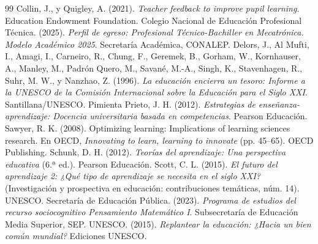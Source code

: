 \documentclass[spanish,letterpaper,oneside]{article}
\begin{document}
\clearpage
\begin{thebibliography}{99}
 Collin, J., y Quigley, A. (2021). \textit{Teacher feedback to improve pupil learning}. Education Endowment Foundation.
 Colegio Nacional de Educación Profesional Técnica. (2025). \textit{Perfil de egreso: Profesional Técnico-Bachiller en Mecatrónica. Modelo Académico 2025}. Secretaría Académica, CONALEP.
 Delors, J., Al Mufti, I., Amagi, I., Carneiro, R., Chung, F., Geremek, B., Gorham, W., Kornhauser, A., Manley, M., Padrón Quero, M., Savané, M.-A., Singh, K., Stavenhagen, R., Suhr, M. W., y Nanzhao, Z. (1996). \textit{La educación encierra un tesoro: Informe a la UNESCO de la Comisión Internacional sobre la Educación para el Siglo XXI}. Santillana/UNESCO.
 Pimienta Prieto, J. H. (2012). \textit{Estrategias de enseñanza-aprendizaje: Docencia universitaria basada en competencias}. Pearson Educación.
 Sawyer, R. K. (2008). Optimizing learning: Implications of learning sciences research. En OECD, \textit{Innovating to learn, learning to innovate} (pp. 45--65). OECD Publishing.
 Schunk, D. H. (2012). \textit{Teorías del aprendizaje: Una perspectiva educativa} (6.ª ed.). Pearson Educación.
 Scott, C. L. (2015). \textit{El futuro del aprendizaje 2: ¿Qué tipo de aprendizaje se necesita en el siglo XXI?} (Investigación y prospectiva en educación: contribuciones temáticas, núm. 14). UNESCO.
 Secretaría de Educación Pública. (2023). \textit{Programa de estudios del recurso sociocognitivo Pensamiento Matemático I}. Subsecretaría de Educación Media Superior, SEP.
 UNESCO. (2015). \textit{Replantear la educación: ¿Hacia un bien común mundial?} Ediciones UNESCO.
\end{thebibliography}
\end{document}
